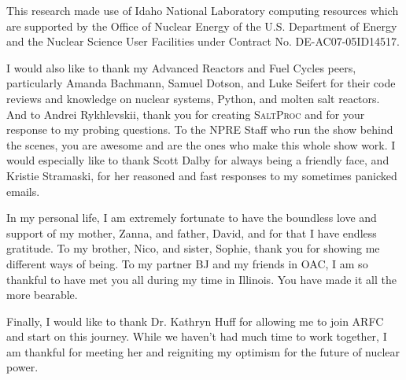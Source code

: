 \documentclass[edeposit,fullpage,hidelinks]{uiucthesis2018}
\newcommand{\SaltProc}{\textsc{SaltProc}\xspace}
\begin{document}
This research made use of Idaho National Laboratory computing resources which
are supported by the Office of Nuclear Energy of the U.S. Department of Energy
and the Nuclear Science User Facilities under Contract No. DE-AC07-05ID14517.

I would also like to thank my Advanced Reactors and Fuel Cycles peers,
particularly Amanda Bachmann, Samuel Dotson, and Luke Seifert for their code
reviews and knowledge on nuclear systems, Python, and molten salt reactors. And
to Andrei Rykhlevskii, thank you for creating \SaltProc and for your response to
my probing questions. To the NPRE Staff who run the show behind the scenes, you
are awesome and are the ones who make this whole show work. I would especially
like to thank Scott Dalby for always being a friendly face, and Kristie
Stramaski, for her reasoned and fast responses to my sometimes panicked emails.

In my personal life, I am extremely fortunate to have the boundless love and
support of my mother, Zanna, and father, David, and for that I have endless
gratitude. To my brother, Nico, and sister, Sophie, thank you for showing me
different ways of being. To my partner BJ and my friends in OAC, I am so
thankful to have met you all during my time in Illinois. You have made it all
the more bearable.

Finally, I would like to thank Dr. Kathryn Huff for allowing me to join ARFC and
start on this journey. While we haven't had much time to work together, I am
thankful for meeting her and reigniting my optimism for the future of nuclear
power.


\tableofcontents
\listoftables
\listoffigures


\pagebreak
\mainmatter








\backmatter




\mainmatter
\appendix

\end{document}
